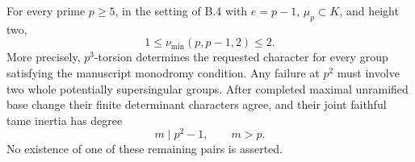 \begin{theorem}
\label{thm:B-RD49}
For every prime $p\geq5$, in the setting of B.4 with
$e=p-1$, $\mu_p\subset K$, and height two,
\[
                         1\leq\nu_{\min}(p,p-1,2)\leq2.
                                                        \tag{B-RD49.9}
\]
More precisely, $p^3$-torsion determines the requested character
for every group satisfying the manuscript monodromy condition.
Any failure at $p^2$ must involve two whole potentially
supersingular groups. After completed maximal unramified base
change their finite determinant characters agree, and their
joint faithful tame inertia has degree
\[
                            m\mid p^2-1,\qquad m>p.    \tag{B-RD49.10}
\]
No existence of one of these remaining pairs is asserted.
\end{theorem}
